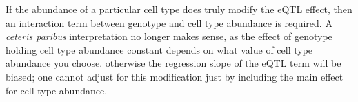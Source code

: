 

If the abundance of a particular cell type does truly modify the \gls{eQTL} effect, 
then an interaction term between genotype and cell type abundance is required.
A \textit{ceteris paribus} interpretation no longer makes sense,
as the effect of genotype holding cell type abundance constant depends on what value of cell type abundance you choose.
otherwise the regression slope of the \gls{eQTL} term will be biased;
one cannot adjust for this modification just by including the main effect for cell type abundance.
